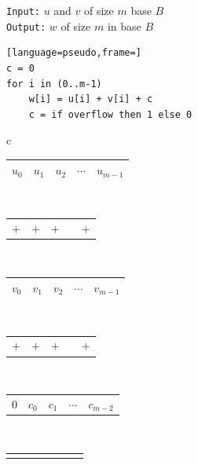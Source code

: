 \begin{figure}
  \centering
  \begin{minipage}{0.45\textwidth}
    \small
    \texttt{Input:} $u$ and $v$ of size $m$ base $B$\\
    \texttt{Output:} $w$ of size $m$ in base $B$
\begin{lstlisting}[language=pseudo,frame=]
c = 0
for i in (0..m-1)
    w[i] = u[i] + v[i] + c
    c = if overflow then 1 else 0
\end{lstlisting}
  \end{minipage}
  \begin{minipage}{0.45\textwidth}
    \centering
    \footnotesize
    \begin{tabular}{c}
      \begin{tabular}{|C{0.7cm}|C{0.7cm}|C{0.7cm}|C{0.7cm}|C{0.7cm}|}
        \hline
        $u_0$ & $u_1$ & $u_2$ & $\cdots$ & $u_{m-1}$\\ 
        \hline
      \end{tabular}\\
      \begin{tabular}{C{0.7cm}C{0.7cm}C{0.7cm}C{0.7cm}C{0.7cm}}
        $+$ & $+$ & $+$ & & $+$\\ 
      \end{tabular}\\
      \begin{tabular}{|C{0.7cm}|C{0.7cm}|C{0.7cm}|C{0.7cm}|C{0.7cm}|}
        \hline
        $v_0$ & $v_1$ & $v_2$ & $\cdots$ & $v_{m-1}$\\
        \hline
      \end{tabular}\\
      \begin{tabular}{C{0.7cm}C{0.7cm}C{0.7cm}C{0.7cm}C{0.7cm}}
        $+$ & $+$ & $+$ &  & $+$\\
      \end{tabular}\\
      \begin{tabular}{C{0.7cm}C{0.7cm}C{0.7cm}C{0.7cm}C{0.7cm}}
        $0$ & $c_0$ &  $c_1$ & $\cdots$ &$c_{m-2}$ \\
      \end{tabular}\\[-0.8ex]
      \begin{tabular}{C{0.15cm}C{0.15cm}C{0.15cm}C{0.15cm}C{0.15cm}C{0.15cm}C{0.15cm}}
       \diagonalarrow{} & & \diagonalarrow{} &  & \diagonalarrow{} &  & \diagonalarrow{}\\
      \end{tabular}\\[-2ex]

\end{tabular}
\end{minipage}
\end{figure}
